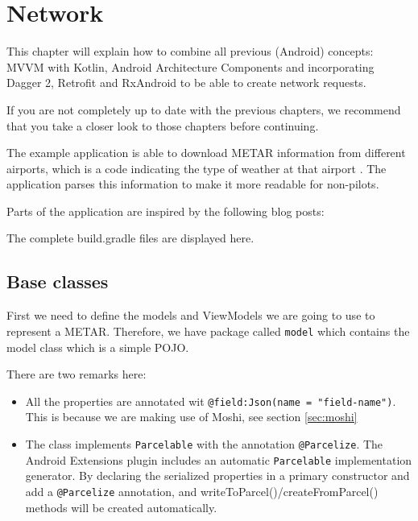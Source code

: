 
\chapter{Network}
This chapter will explain how to combine all previous (Android) concepts: MVVM with Kotlin, Android Architecture Components and incorporating Dagger 2, Retrofit and RxAndroid to be able to create network requests. 

If you are not completely up to date with the previous chapters, we recommend that you take a closer look to those chapters before continuing. 

The example application is able to download METAR information from different airports, which is a code indicating the type of weather at that airport \cite{Wikipedia2018}.
The application parses this information to make it more readable for non-pilots. 

Parts of the application are inspired by the following blog posts: \cite{Gahfy2018, Tiwari2018, Saquib2018}

The complete build.gradle files are displayed here. 






\section{Base classes}
First we need to define the models and ViewModels we are going to use to represent a METAR.
Therefore, we have package called \lstinline!model! which contains the model class which is a simple POJO.



There are two remarks here:
\begin{itemize}
	\item All the properties are annotated wit \lstinline!@field:Json(name = "field-name")!.
	This is because we are making use of Moshi, see section \ref{sec:moshi}
	\item  The class implements \lstinline|Parcelable| with the annotation \lstinline|@Parcelize|.
	The Android Extensions plugin  includes an automatic \lstinline|Parcelable| implementation generator.
	By declaring the serialized properties in a primary constructor and add a \lstinline|@Parcelize| annotation, and writeToParcel()/createFromParcel() methods will be created automatically.
\end{itemize}

